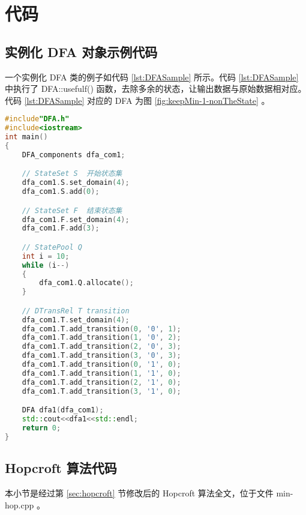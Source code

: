 \chapter{代码}

\section{实例化 DFA 对象示例代码}

一个实例化 DFA 类的例子如代码 \ref{lst:DFASample} 所示。代码 \ref{lst:DFASample} 中执行了 DFA::usefulf() 函数，去除多余的状态，让输出数据与原始数据相对应。代码 \ref{lst:DFASample} 对应的 DFA 为图 \ref{fig:keepMin-1-nonTheState} 。


\lstset{style=mystyle}
\begin{lstlisting}[language=C++,label={lst:DFASample},caption={实例化DFA示例}]
#include"DFA.h"
#include<iostream>
int main()
{
    DFA_components dfa_com1;

    // StateSet S  开始状态集
    dfa_com1.S.set_domain(4);
    dfa_com1.S.add(0);

    // StateSet F  结束状态集
    dfa_com1.F.set_domain(4);
    dfa_com1.F.add(3);

    // StatePool Q 
    int i = 10;
    while (i--)
    {
        dfa_com1.Q.allocate();
    }

    // DTransRel T transition             
    dfa_com1.T.set_domain(4);
    dfa_com1.T.add_transition(0, '0', 1);
    dfa_com1.T.add_transition(1, '0', 2);
    dfa_com1.T.add_transition(2, '0', 3);
    dfa_com1.T.add_transition(3, '0', 3);
    dfa_com1.T.add_transition(0, '1', 0);
    dfa_com1.T.add_transition(1, '1', 0);
    dfa_com1.T.add_transition(2, '1', 0);
    dfa_com1.T.add_transition(3, '1', 0);

    DFA dfa1(dfa_com1);
    std::cout<<dfa1<<std::endl;
    return 0;
}
\end{lstlisting}

\section{Hopcroft 算法代码}

本小节是经过第 \ref{sec:hopcroft} 节修改后的 Hopcroft 算法全文，位于文件 min-hop.cpp 。

